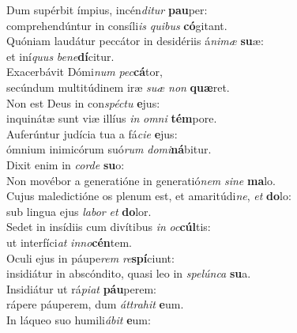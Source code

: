 \oddverse Dum supérbit ímpius, incén\textit{di}\textit{tur} \textbf{pau}per:~\*\\
\oddverse comprehendúntur in consíli\textit{is} \textit{qui}\textit{bus} \textbf{có}gitant.\\
\evenverse Quóniam laudátur peccátor in desidériis á\textit{ni}\textit{mæ} \textbf{su}æ:~\*\\
\evenverse et iní\textit{quus} \textit{be}\textit{ne}\textbf{dí}citur.\\
\oddverse Exacerbávit Dómi\textit{num} \textit{pec}\textbf{cá}tor,~\*\\
\oddverse secúndum multitúdinem iræ \textit{su}\textit{æ} \textit{non} \textbf{quæ}ret.\\
\evenverse Non est Deus in con\textit{spé}\textit{ctu} \textbf{e}jus:~\*\\
\evenverse inquinátæ sunt viæ illíus \textit{in} \textit{om}\textit{ni} \textbf{tém}pore.\\
\oddverse Auferúntur judícia tua a fá\textit{ci}\textit{e} \textbf{e}jus:~\*\\
\oddverse ómnium inimicórum suó\textit{rum} \textit{do}\textit{mi}\textbf{ná}bitur.\\
\evenverse Dixit enim in \textit{cor}\textit{de} \textbf{su}o:~\*\\
\evenverse Non movébor a generatióne in generatió\textit{nem} \textit{si}\textit{ne} \textbf{ma}lo.\\
\oddverse Cujus maledictióne os plenum est, et amaritúdi\textit{ne}, \textit{et} \textbf{do}lo:~\*\\
\oddverse sub lingua ejus \textit{la}\textit{bor} \textit{et} \textbf{do}lor.\\
\evenverse Sedet in insídiis cum divítibus \textit{in} \textit{oc}\textbf{cúl}tis:~\*\\
\evenverse ut interfíci\textit{at} \textit{in}\textit{no}\textbf{cén}tem.\\
\oddverse Oculi ejus in páupe\textit{rem} \textit{re}\textbf{spí}ciunt:~\*\\
\oddverse insidiátur in abscóndito, quasi leo in \textit{spe}\textit{lún}\textit{ca} \textbf{su}a.\\
\evenverse Insidiátur ut rá\textit{pi}\textit{at} \textbf{páu}perem:~\*\\
\evenverse rápere páuperem, dum \textit{át}\textit{tra}\textit{hit} \textbf{e}um.\\
\oddverse In láqueo suo humili\textit{á}\textit{bit} \textbf{e}um:~\*\\
